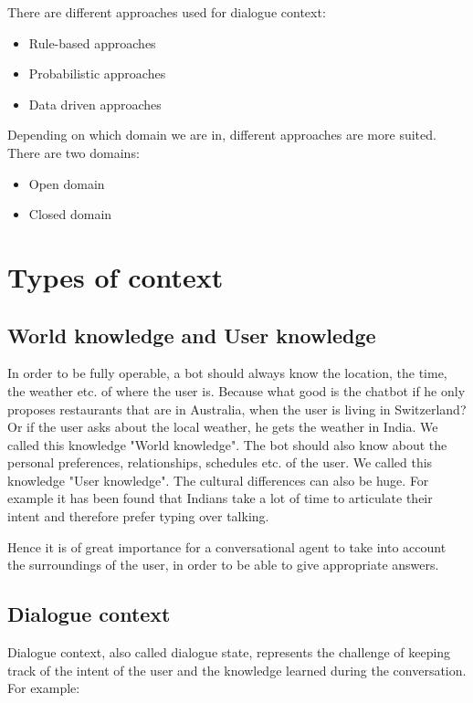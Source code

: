 \documentclass[conference]{IEEEtran}
\begin{document}
There are different approaches used for dialogue context: 
\begin{itemize}
\item{Rule-based approaches}
\item{Probabilistic approaches}
\item{Data driven approaches}
\end{itemize}

Depending on which domain we are in, different approaches are more suited. There are two domains: 
\begin{itemize}
\item{Open domain}
\item{Closed domain}
\end{itemize}

\section{Types of context}
\subsection{World knowledge and User knowledge}
In order to be fully operable, a bot should always know the location, the time, the weather etc. of where the user is. Because what good is the chatbot if he only proposes restaurants that are in Australia, when the user is living in Switzerland? Or if the user asks about the local weather, he gets the weather in India. We called this knowledge "World knowledge".
The bot should also know about the personal preferences, relationships, schedules etc. of the user. We called this knowledge "User knowledge".
The cultural differences can also be huge. For example it has been found that Indians take a lot of time to articulate their intent and therefore prefer typing over talking\cite{chopra2017my}.

Hence it is of great importance for a conversational agent to take into account the surroundings of the user, in order to be able to give appropriate answers.


\subsection{Dialogue context}
Dialogue context, also called dialogue state, represents the challenge of keeping track of the intent of the user and the knowledge learned during the conversation. For example: 
\end{document}
